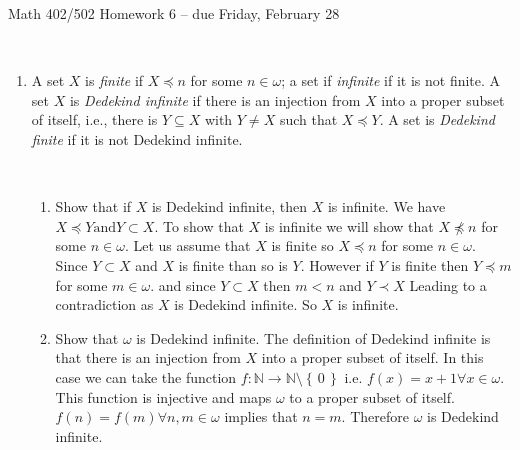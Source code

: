 \documentclass[11pt]{amsart}
\newcommand{\set}[1]{\left\{\,#1\,\right\}}
\begin{document}
\begin{center}
{\Large Math 402/502 Homework 6 -- due Friday, February 28}
\ \\
\end{center}

\ \\
 
 \begin{enumerate}

\item A set $X$ is  \emph{finite} if $X \preccurlyeq n$ for some $n \in \omega$; a set if \emph{infinite} if it is not finite. A set $X$ is \emph{Dedekind infinite} if there is an injection from $X$ into a proper subset of itself, i.e., there is $Y \subseteq X$ with $Y \neq X$ such that $X \preccurlyeq Y$. A set is {\it Dedekind finite} if it is not Dedekind infinite.

\ 
\begin{enumerate}
\item Show that if $X$ is Dedekind infinite, then $X$ is infinite.
We have $X \preceq Y \text{and} Y \subset X$.
To show that $X$ is infinite we will show that $X \npreceq n$ for some $n \in \omega$.
Let us assume that $X$ is finite so $X \preceq n$ for some $n \in \omega$.
Since $Y \subset X$ and $X$ is finite than so is $Y$.
However if $Y$ is finite then $Y \preceq m$ for some $m \in \omega$.
and since $Y \subset X$ then $m < n$ and $Y \prec X$
Leading to a contradiction as $X$ is Dedekind infinite.
So $X$ is infinite.

\vfill
\item Show that $\omega$ is Dedekind infinite.
The definition of Dedekind infinite is that there is an injection from $X$ into a proper subset of itself.
In this case we can take the function $f: \mathbb{N} \rightarrow \mathbb{N}\setminus \set{0}$ i.e. $f(x) = x+1 \forall x \in \omega$.
This function is injective and maps $\omega$ to a proper subset of itself.
$f(n) = f(m) \forall n,m \in \omega$ implies that $n = m$.
Therefore $\omega$ is Dedekind infinite.


\end{enumerate}
\end{enumerate}
\end{document}
